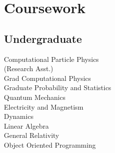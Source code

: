 

\section{Coursework}
\subsection{Undergraduate}
Computational Particle Physics \\
(Research Asst.)\\
Grad Computational Physics\\
Graduate Probability and Statistics \\
Quantum Mechanics\\
Electricity and Magnetism\\
Dynamics\\
Linear Algebra\\
General Relativity\\
Object Oriented Programming\\
\sectionsep
